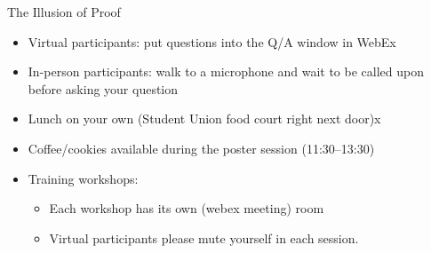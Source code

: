 \documentclass[aspectratio=169, 12pt]{beamer}
\begin{document}
\begin{frame}{The Illusion of Proof}
  \begin{itemize}
  \item Virtual participants: put questions into the Q/A window in WebEx
  \item In-person participants: walk to a microphone and wait to be called upon
    before asking your question
  \item Lunch on your own (Student Union food court right next door)x
  \item Coffee/cookies available during the poster session (11:30--13:30)
  \item Training workshops:
    \begin{itemize}
    \item Each workshop has its own (webex meeting) room
    \item Virtual participants please mute yourself in each session.
    \end{itemize}
  \end{itemize}
\end{frame}
\end{document}
